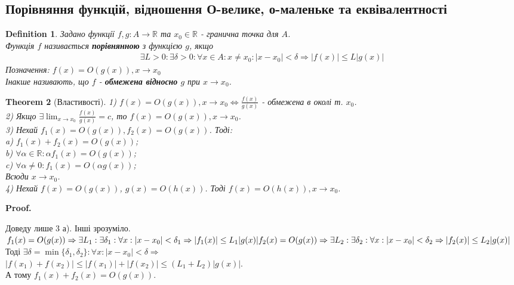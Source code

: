 \documentclass[a4paper, 14pt]{article}
\makeatletter
\def\qed{$\blacksquare$}
\theoremstyle{theoremdd}
\newtheorem{theorem}{Theorem}[subsection]
\theoremstyle{theoremdd}
\newtheorem{definition}[theorem]{Definition}
\theoremstyle{theoremdd}
\theoremstyle{theoremdd}
\theoremstyle{theoremdd}
\theoremstyle{theoremdd}
\theoremstyle{theoremdd}
\theoremstyle{theoremdd}
\renewenvironment{proof}[1][Proof.\\]{\par
\pushQED{\hfill \qed}%
\normalfont \topsep6\p@\@plus6\p@\relax
\trivlist
\item\relax
{\bfseries
#1\@addpunct{.}}\hspace\labelsep\ignorespaces
}{%
\popQED\endtrivlist\@endpefalse
}
\makeatother
\begin{document}
\subsection{Порівняння функцій, відношення О-велике, о-маленьке та еквівалентності}
\begin{definition}
Задано функції $f,g: A \to \mathbb{R}$ та $x_0 \in \mathbb{R}$ - гранична точка для $A$.\\
Функція $f$ називається \textbf{порівнянною} з функцією $g$, якщо
\begin{align*}
\exists L>0: \exists \delta > 0: \forall x \in A: x \neq x_0: |x-x_0| < \delta \Rightarrow |f(x)| \leq L |g(x)|
\end{align*}
Позначення: $f(x) = O(g(x)), x \to x_0$\\
Інакше називають, що $f$ - \textbf{обмежена відносно} $g$ при $x \to x_0$.
\end{definition}

\begin{theorem}[Властивості]
1) $f(x) = O(g(x)), x \to x_0 \iff \displaystyle \frac{f(x)}{g(x)}$ - обмежена в околі т. $x_0$.
\bigskip \\
2) Якщо $\exists \displaystyle \lim_{x \to x_0} \frac{f(x)}{g(x)} = c$, то $f(x) = O(g(x)), x \to x_0$.
\bigskip \\
3) Нехай $f_1(x) = O(g(x)), f_2(x) = O(g(x))$. Тоді:\\
a) $f_1(x) + f_2(x) = O(g(x))$;\\
b) $\forall \alpha \in \mathbb{R}: \alpha f_1(x) = O(g(x))$;\\
c) $\forall \alpha \neq 0: f_1(x) = O(\alpha g(x))$;\\
Всюди $x \to x_0$.
\bigskip \\
4) Нехай $f(x) = O(g(x))$, $g(x) = O(h(x))$. Тоді $f(x) = O(h(x)), x \to x_0$.
\end{theorem}

\begin{proof}
Доведу лише 3 а). Інші зрозуміло.\\
$f_1(x) = O(g(x)) \Rightarrow \exists L_1: \exists \delta_1: \forall x : |x-x_0| < \delta_1 \Rightarrow |f_1(x)| \leq L_1 |g(x)| \\
f_2(x) = O(g(x)) \Rightarrow \exists L_2: \exists \delta_2: \forall x : |x-x_0| < \delta_2 \Rightarrow |f_2(x)| \leq L_2 |g(x)|$\\
Тоді $\exists \delta = \min\{\delta_1, \delta_2 \}: \forall x: |x-x_0|<\delta \Rightarrow$\\
$|f(x_1)+f(x_2)| \leq |f(x_1)|+|f(x_2)| \leq (L_1+L_2)|g(x)|$.\\
А тому $f_1(x) + f_2(x) = O(g(x))$.
\end{proof}
\end{document}
